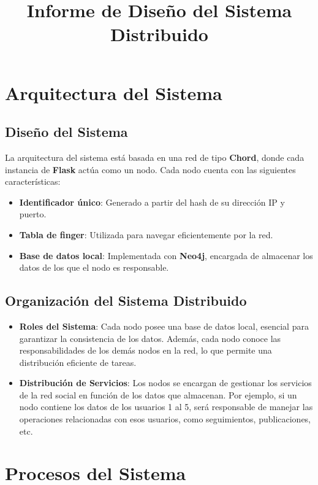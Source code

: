 \documentclass{article}
\title{Informe de Diseño del Sistema Distribuido}
\author{}
\date{}
\begin{document}
\maketitle

\section{Arquitectura del Sistema}

\subsection{Diseño del Sistema}

La arquitectura del sistema está basada en una red de tipo \textbf{Chord}, donde cada instancia de \textbf{Flask} actúa como un nodo. Cada nodo cuenta con las siguientes características:

\begin{itemize}
    \item \textbf{Identificador único}: Generado a partir del hash de su dirección IP y puerto.
    \item \textbf{Tabla de finger}: Utilizada para navegar eficientemente por la red.
    \item \textbf{Base de datos local}: Implementada con \textbf{Neo4j}, encargada de almacenar los datos de los que el nodo es responsable.
\end{itemize}

\subsection{Organización del Sistema Distribuido}

\begin{itemize}
    \item \textbf{Roles del Sistema}: Cada nodo posee una base de datos local, esencial para garantizar la consistencia de los datos. Además, cada nodo conoce las responsabilidades de los demás nodos en la red, lo que permite una distribución eficiente de tareas.
    \item \textbf{Distribución de Servicios}: Los nodos se encargan de gestionar los servicios de la red social en función de los datos que almacenan. Por ejemplo, si un nodo contiene los datos de los usuarios 1 al 5, será responsable de manejar las operaciones relacionadas con esos usuarios, como seguimientos, publicaciones, etc.
\end{itemize}

\section{Procesos del Sistema}
\end{document}
